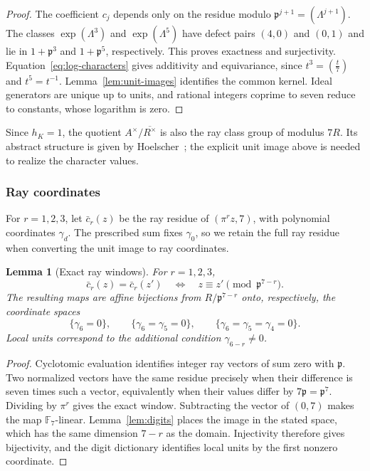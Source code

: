 \documentclass[11pt]{amsart}
\theoremstyle{plain}
\newtheorem{lemma}[theorem]{Lemma}
\theoremstyle{definition}
\numberwithin{equation}{section}
\newcommand{\F}{\mathbb F}
\newcommand{\pp}{\mathfrak p}
\begin{document}
\begin{proof}
The coefficient $c_j$ depends only on the residue modulo
$\pp^{j+1}=(\Lambda^{j+1})$. The classes $\exp(\Lambda^3)$ and
$\exp(\Lambda^5)$ have defect pairs $(4,0)$ and $(0,1)$ and lie
in $1+\pp^3$ and $1+\pp^5$, respectively. This proves exactness
and surjectivity. Equation~\eqref{eq:log-characters} gives additivity
and equivariance, since $t^3=(\frac t7)$ and $t^5=t^{-1}$.
Lemma~\ref{lem:unit-images} identifies the common kernel. Ideal
generators are unique up to units, and rational integers coprime
to seven reduce to constants, whose logarithm is zero.
\end{proof}

Since $h_K=1$, the quotient $A^\times/\overline{R^\times}$ is also
the ray class group of modulus $7R$. Its abstract structure is given
by Hoelscher~\cite[Theorem~1.4]{Hoelscher2010}; the explicit unit
image above is needed to realize the character values.

\subsubsection{Ray coordinates}

For $r=1,2,3$, let $\bar c_r(z)$ be the ray residue of $(\pi^rz,7)$,
with polynomial coordinates $\gamma_d$.
The prescribed sum fixes $\gamma_0$, so we retain the full ray residue
when converting the unit image to ray coordinates.

\begin{lemma}[Exact ray windows]\label{lem:ray-exact-window}
For $r=1,2,3$,
\[
 \bar c_r(z)=\bar c_r(z')
       \quad\Longleftrightarrow\quad z\equiv z'\pmod{\pp^{7-r}}.
\]
The resulting maps are affine bijections from $R/\pp^{7-r}$ onto,
respectively, the coordinate spaces
\[
 \{\gamma_6=0\},\qquad
 \{\gamma_6=\gamma_5=0\},\qquad
 \{\gamma_6=\gamma_5=\gamma_4=0\}.
\]
Local units correspond to the additional condition
$\gamma_{6-r}\ne0$.
\end{lemma}

\begin{proof}
Cyclotomic evaluation identifies integer ray vectors of sum zero
with $\pp$. Two normalized vectors have the same residue precisely
when their difference is seven times such a vector, equivalently
when their values differ by $7\pp=\pp^7$. Dividing by $\pi^r$
gives the exact window. Subtracting the vector of $(0,7)$ makes
the map $\F_7$-linear. Lemma~\ref{lem:digits} places the image in
the stated space, which has the same dimension $7-r$ as the domain.
Injectivity therefore gives bijectivity, and the digit dictionary
identifies local units by the first nonzero coordinate.
\end{proof}
\end{document}
